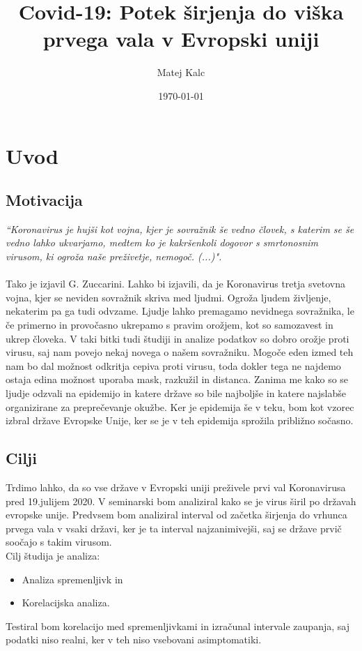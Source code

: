 \documentclass[a4paper,11pt]{article}
\title{Covid-19: Potek širjenja do viška prvega vala v Evropski uniji}
\author{Matej Kalc} %
\date{\today}
\begin{document}
\maketitle

\section{Uvod}
\subsection{Motivacija}


\emph{“Koronavirus je hujši kot vojna, kjer je sovražnik še vedno človek, s katerim se še
vedno lahko ukvarjamo, medtem ko je kakršenkoli dogovor s smrtonosnim virusom,
ki ogroža naše preživetje, nemogoč. (...)".} \cite{zucc}\\ \\
Tako je izjavil G. Zuccarini. Lahko bi izjavili, da je Koronavirus tretja svetovna vojna, kjer se neviden sovražnik skriva med ljudmi. Ogroža ljudem življenje, nekaterim pa ga tudi odvzame. Ljudje lahko premagamo nevidnega sovražnika, le če primerno in provočasno ukrepamo s pravim orožjem, kot so samozavest in ukrep človeka. V taki bitki tudi študiji in analize podatkov so dobro orožje proti virusu, saj nam povejo nekaj novega o našem sovražniku. Mogoče eden izmed teh nam bo dal možnost odkritja cepiva proti virusu, toda dokler tega ne najdemo ostaja edina možnost uporaba mask, razkužil in distanca. Zanima me kako so se ljudje odzvali na epidemijo in katere države so bile najboljše in katere najslabše organizirane za preprečevanje okužbe. Ker je epidemija še v teku, bom kot vzorec izbral države Evropske Unije, ker se je v teh epidemija sprožila približno sočasno. 


\subsection{Cilji}
Trdimo lahko, da so vse države v Evropski uniji \cite{eu} preživele prvi val Koronavirusa pred 19.julijem 2020. V seminarski bom analiziral kako se je virus širil po državah evropske unije. Predvsem bom analiziral interval od začetka širjenja do vrhunca prvega vala v vsaki državi, ker je ta interval najzanimivejši, saj se države prvič soočajo s takim virusom. \\
Cilj študija je analiza:
\begin{itemize}
\item{Analiza spremenljivk in}
\item{Korelacijska analiza.}
\end{itemize}
Testiral bom korelacijo med spremenljivkami in izračunal intervale zaupanja, saj podatki niso realni, ker v teh niso vsebovani asimptomatiki.
\end{document}
